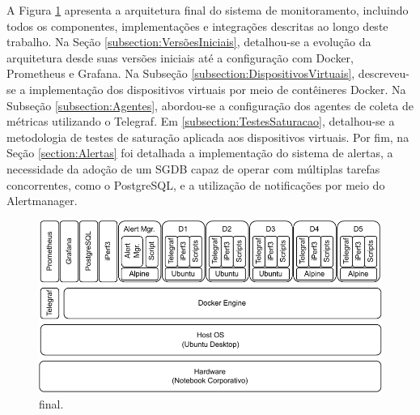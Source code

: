 {\color{red}
A Figura \ref{fig:StackFinal} apresenta a arquitetura final do sistema de monitoramento, incluindo todos os componentes, implementações e integrações descritas ao longo deste trabalho. Na Seção \ref{subsection:VersõesIniciais}, detalhou-se a evolução da arquitetura desde suas versões iniciais até a configuração com Docker, Prometheus e Grafana. Na Subseção \ref{subsection:DispositivosVirtuais}, descreveu-se a implementação dos dispositivos virtuais por meio de contêineres Docker. Na Subseção \ref{subsection:Agentes}, abordou-se a configuração dos agentes de coleta de métricas utilizando o Telegraf. Em \ref{subsection:TestesSaturacao}, detalhou-se a metodologia de testes de saturação aplicada aos dispositivos virtuais. Por fim, na Seção \ref{section:Alertas} foi detalhada a implementação do sistema de alertas, a necessidade da adoção de um SGDB capaz de operar com múltiplas tarefas concorrentes, como o PostgreSQL, e a utilização de notificações por meio do Alertmanager.}
\begin{figure}[H]
\centering
\setlength{\abovecaptionskip}{-20pt}
\includegraphics[width=\textwidth]{Imagens/chap04/final_stack.pdf}
\caption{ final.}
\label{fig:StackFinal}
\end{figure}


